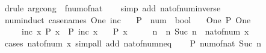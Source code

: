 \begin{isabellebody}
\ {\isacharparenleft}{\kern0pt}drule\ arg{\isacharunderscore}{\kern0pt}cong\ {\isacharbrackleft}{\kern0pt}\ f{\isacharequal}{\kern0pt}num{\isacharunderscore}{\kern0pt}of{\isacharunderscore}{\kern0pt}nat{\isacharbrackright}{\kern0pt}{\isacharparenright}{\kern0pt}\isanewline
\ \ \isamarkupfalse%
\ {\isacharparenleft}{\kern0pt}simp\ add{\isacharcolon}{\kern0pt}\ nat{\isacharunderscore}{\kern0pt}of{\isacharunderscore}{\kern0pt}num{\isacharunderscore}{\kern0pt}inverse{\isacharparenright}{\kern0pt}\isanewline
\ \ \isamarkupfalse%
%
\endisatagproof
{\isafoldproof}%
%
\isadelimproof
\isanewline
%
\endisadelimproof
\isanewline
{}\isamarkupfalse%
\ num{\isacharunderscore}{\kern0pt}induct\ {\isacharbrackleft}{\kern0pt}case{\isacharunderscore}{\kern0pt}names\ One\ inc{\isacharbrackright}{\kern0pt}{\isacharcolon}{\kern0pt}\isanewline
\ \ \ P\ {\isacharcolon}{\kern0pt}{\isacharcolon}{\kern0pt}\ {\isachardoublequoteopen}num\ {\isasymRightarrow}\ bool{\isachardoublequoteclose}\isanewline
\ \ \ One{\isacharcolon}{\kern0pt}\ {\isachardoublequoteopen}P\ One{\isachardoublequoteclose}\isanewline
\ \ \ \ \ inc{\isacharcolon}{\kern0pt}\ {\isachardoublequoteopen}{\isasymAnd}x{\isachardot}{\kern0pt}\ P\ x\ {\isasymLongrightarrow}\ P\ {\isacharparenleft}{\kern0pt}inc\ x{\isacharparenright}{\kern0pt}{\isachardoublequoteclose}\isanewline
\ \ \ {\isachardoublequoteopen}P\ x{\isachardoublequoteclose}\isanewline
%
\isadelimproof
%
\endisadelimproof
%
\isatagproof
{}\isamarkupfalse%
\ {\isacharminus}{\kern0pt}\isanewline
\ \ \isamarkupfalse%
\ n\ \ n{\isacharcolon}{\kern0pt}\ {\isachardoublequoteopen}Suc\ n\ {\isacharequal}{\kern0pt}\ nat{\isacharunderscore}{\kern0pt}of{\isacharunderscore}{\kern0pt}num\ x{\isachardoublequoteclose}\isanewline
\ \ \ \ \isamarkupfalse%
\ {\isacharparenleft}{\kern0pt}cases\ {\isachardoublequoteopen}nat{\isacharunderscore}{\kern0pt}of{\isacharunderscore}{\kern0pt}num\ x{\isachardoublequoteclose}{\isacharparenright}{\kern0pt}\ {\isacharparenleft}{\kern0pt}simp{\isacharunderscore}{\kern0pt}all\ add{\isacharcolon}{\kern0pt}\ nat{\isacharunderscore}{\kern0pt}of{\isacharunderscore}{\kern0pt}num{\isacharunderscore}{\kern0pt}neq{\isacharunderscore}{\kern0pt}{}{\isacharparenright}{\kern0pt}\isanewline
\ \ \isamarkupfalse%
\ {\isachardoublequoteopen}P\ {\isacharparenleft}{\kern0pt}num{\isacharunderscore}{\kern0pt}of{\isacharunderscore}{\kern0pt}nat\ {\isacharparenleft}{\kern0pt}Suc\ n{\isacharparenright}{\kern0pt}{\isacharparenright}{\kern0pt}{\isachardoublequoteclose}\isanewline

\end{isabellebody}
